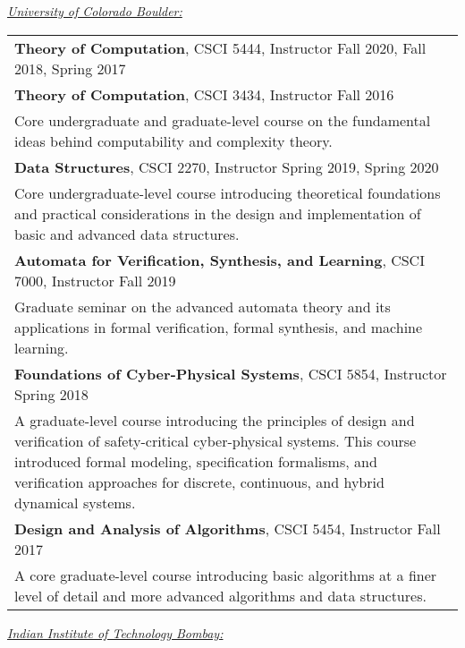 \documentclass{article}
\begin{document}
\vspace{1em}
\noindent \underline{{\em University of Colorado Boulder:}}
\vspace{-1em}
\begin{center}
  \begin{tabular}{ p{16.5cm}}
{\bf Theory of Computation}, CSCI 5444, Instructor \hfill Fall 2020,
Fall 2018, Spring 2017 \\[3pt]
{\bf Theory of Computation}, CSCI 3434, Instructor \hfill Fall 2016 \\[3pt]
\hspace{2em}  Core undergraduate and graduate-level course on the fundamental ideas behind
computability and complexity theory. \\ [7pt]
%
{\bf Data Structures}, CSCI 2270, Instructor \hfill Spring 2019, Spring 2020 \\[3pt]
\hspace{2em}  Core undergraduate-level course introducing theoretical
foundations and practical considerations in the design and implementation of
basic and advanced data structures.\\ [7pt] 
%
{\bf Automata for Verification, Synthesis, and Learning}, CSCI 7000, Instructor
\hfill Fall 2019 \\[3pt]
\hspace{2em}  Graduate seminar on the advanced automata theory and
its applications in formal verification, formal synthesis, and machine learning. 
\\ [7pt]
%
{\bf Foundations of Cyber-Physical Systems}, CSCI 5854, Instructor \hfill Spring
2018 \\[3pt] 
\hspace{2em}  A graduate-level course introducing the principles of design and
verification of safety-critical cyber-physical systems. This course introduced
formal modeling, specification formalisms, and verification approaches for
discrete, continuous, and hybrid dynamical systems. \\ [7pt]
%
{\bf Design and Analysis of Algorithms}, CSCI 5454, Instructor \hfill Fall
2017 \\[3pt] 
\hspace{2em}  A core graduate-level course introducing basic algorithms at a
finer level of detail and more advanced algorithms and data structures.\\ [7pt]
\end{tabular}
\end{center}
\vspace{0.3em}
\noindent \underline{\em Indian Institute of Technology Bombay:}
\end{document}

